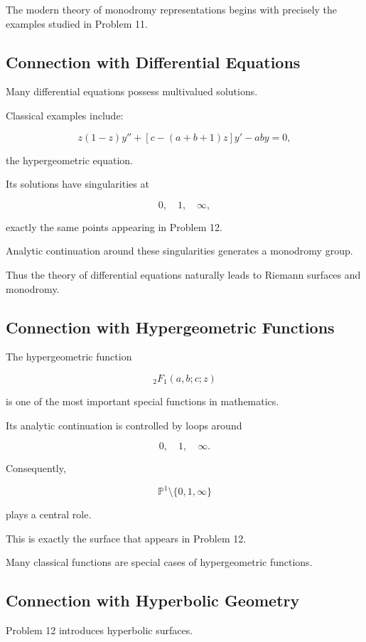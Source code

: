 \documentclass[12pt,a4paper]{article}
\theoremstyle{notespace}
\begin{document}
The modern theory of monodromy representations begins with precisely the examples studied in Problem 11.

\subsection{Connection with Differential Equations}

Many differential equations possess multivalued solutions.

Classical examples include:

\[
z(1-z)y''+[c-(a+b+1)z]y'-aby=0,
\]

the hypergeometric equation.

Its solutions have singularities at

\[
0,\quad 1,\quad \infty,
\]

exactly the same points appearing in Problem 12.

Analytic continuation around these singularities generates a monodromy group.

Thus the theory of differential equations naturally leads to Riemann surfaces and monodromy.

\subsection{Connection with Hypergeometric Functions}

The hypergeometric function

\[
{}_2F_1(a,b;c;z)
\]

is one of the most important special functions in mathematics.

Its analytic continuation is controlled by loops around

\[
0,\quad 1,\quad \infty.
\]

Consequently,

\[
\mathbb P^1\setminus\{0,1,\infty\}
\]

plays a central role.

This is exactly the surface that appears in Problem 12.

Many classical functions are special cases of hypergeometric functions.

\subsection{Connection with Hyperbolic Geometry}

Problem 12 introduces hyperbolic surfaces.
\end{document}
